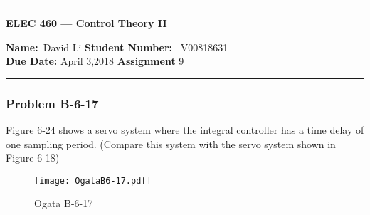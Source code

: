 
\begin{center}
	\hrule
	\vspace{.4cm}
	{\textbf { \large ELEC 460 --- Control Theory II}}
\end{center}
{\textbf{Name:}\ David Li \hspace{\fill} \textbf{Student Number:} \ V00818631  \\}
{\textbf{Due Date:} April 3,2018 \hspace{\fill} \textbf{Assignment}  9}\\
\hrule
\subsubsection*{Problem B-6-17}
\vspace*{-0.5cm}
 Figure 6-24 shows a servo system where the integral controller has a time delay of one sampling period. (Compare this system with the servo system shown in Figure 6-18)
\begin{figure}[H]
	\centering
	\texttt{[image: OgataB6-17.pdf]}
	\caption{Ogata B-6-17}
	\label{fig:ogatab6-17}
\end{figure}

